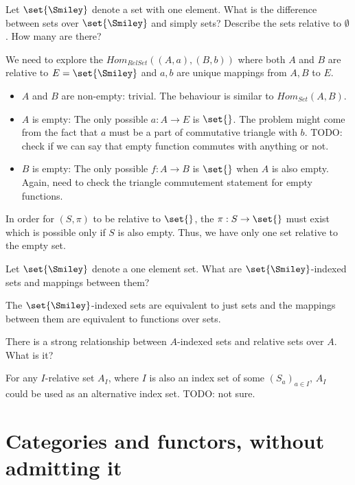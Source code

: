 \documentclass{article}
\begin{document}

\es Let $\set{\Smiley}$ denote a set with one element. What is the difference
    between sets over $\set{\Smiley}$ and simply sets?
\ei Describe the sets relative to $\emptyset$. How many are there?
\ee

\ans

\es We need to explore the $Hom_{RelSet}((A,a),(B,b))$ where both $A$ and $B$
    are relative to $E=\set{\Smiley}$ and $a,b$ are unique mappings from $A,B$
    to $E$.
    \begin{itemize}
    \item $A$ and $B$ are non-empty: trivial. The behaviour is similar to
          $Hom_{Set}(A,B)$.
    \item $A$ is empty: The only possible $a:A \to E$ is $\set{}$. The problem
          might come from the fact that $a$ must be a part of commutative
          triangle with $b$. TODO: check if we can say that empty function
          commutes with anything or not.
    \item $B$ is empty: The only possible $f:A \to B$ is $\set{}$ when $A$ is
          also empty. Again, need to check the triangle commutement statement
          for empty functions.
    \end{itemize}
\ei In order for $(S,\pi)$ to be relative to $\set{}$, the $\pi:S \to \set{}$
    must exist which is possible only if $S$ is also empty. Thus, we have only
    one set relative to the empty set.
\ee


Let $\set{\Smiley}$ denote a one element set. What are $\set{\Smiley}$-indexed
sets and mappings between them?

\ans

The $\set{\Smiley}$-indexed sets are equivalent to just sets and the mappings
between them are equivalent to functions over sets.


There is a strong relationship between $A$-indexed sets and relative sets over
$A$. What is it?

\ans

For any  $I$-relative set $A_I$, where $I$ is also an index set of some
$(S_a)_{a\in I}$, $A_I$ could be used as an alternative index set. TODO: not
sure.

\section{Categories and functors, without admitting it}
\end{document}
